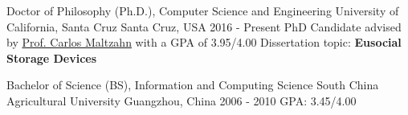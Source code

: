 

\begin{cventries}

  \cventry
    {Doctor of Philosophy (Ph.D.), Computer Science and Engineering} %
    {University of California, Santa Cruz} %
    {Santa Cruz, USA} %
    {2016 - Present} %
    {
        PhD Candidate advised by \href{https://users.soe.ucsc.edu/~carlosm/dev/}{Prof. Carlos Maltzahn} with a GPA of 3.95/4.00 \newline
        Dissertation topic: \textbf{Eusocial Storage Devices}
    }

  \cventry
    {Bachelor of Science (BS), Information and Computing Science}
    {South China Agricultural University}
    {Guangzhou, China}
    {2006 - 2010}
    {GPA: 3.45/4.00}

\end{cventries}

